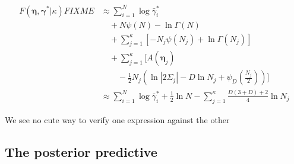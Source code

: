 \documentclass[aps,showpacs,twocolumn,prd,superscriptaddress,nofootinbib]{revtex4}
\newcommand{\nn}{\nonumber}
\begin{document}
\begin{align}
  F(\bm\eta,\bm\gamma^*|\kappa)FIXME
  &\approx\sum_{i=1}^N\log\bar\gamma^*_i\nn\\
  &\quad+N\psi(N)-\ln{\Gamma(N)}\nn\\
  &\quad+\sum_{j=1}^\kappa\left[-N_j\psi(N_j)+\ln\Gamma(N_j)\right]\nn\\
  &\quad+\sum_{j=1}^\kappa\Big[ A({\bm\eta_j})\nn\\
    &\qquad-\frac12N_j\left(\ln\left|2\Sigma_j\right|-D\ln N_j+\psi_D\left(\frac{N_j}2\right)\right)\Big]\nn\\
  &\approx\sum_{i=1}^N\log\bar\gamma^*_i+\frac12\ln N-\sum_{j=1}^\kappa\frac {D(3+D)+2}4\ln N_j
\end{align}

We see no cute way to verify one expression against the other

\subsection{The posterior predictive}
\end{document}
